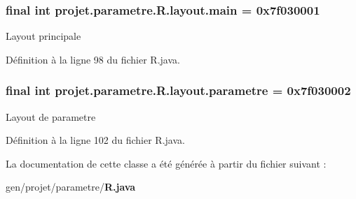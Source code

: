 \subsubsection[{main}]{\setlength{\rightskip}{0pt plus 5cm}final int {\bf projet.\-parametre.\-R.\-layout.\-main} = 0x7f030001\hspace{0.3cm}{\ttfamily  [static]}}\label{classprojet_1_1parametre_1_1_r_1_1layout_ae6a83f2df6cc75c026a1cefad95d86b4}
\-Layout principale 

\-Définition à la ligne 98 du fichier \-R.\-java.

\subsubsection[{parametre}]{\setlength{\rightskip}{0pt plus 5cm}final int {\bf projet.\-parametre.\-R.\-layout.\-parametre} = 0x7f030002\hspace{0.3cm}{\ttfamily  [static]}}\label{classprojet_1_1parametre_1_1_r_1_1layout_a3491b7c0d08ed700f37ce47e84352161}
\-Layout de parametre 

\-Définition à la ligne 102 du fichier \-R.\-java.



\-La documentation de cette classe a été générée à partir du fichier suivant \-:\begin{DoxyCompactItemize}
\item 
gen/projet/parametre/{\bf \-R.\-java}\end{DoxyCompactItemize}
